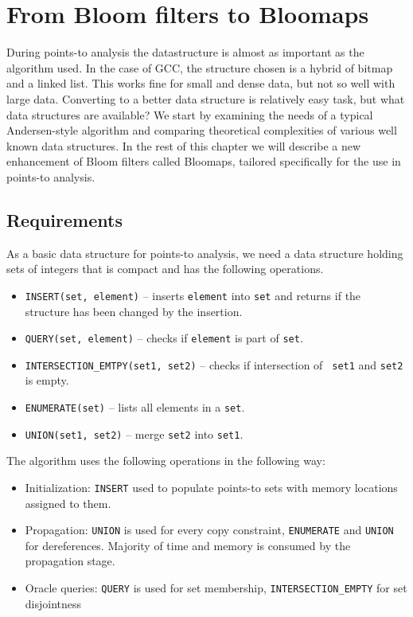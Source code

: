 \chapter{From Bloom filters to Bloomaps}
\label{chap-bloomaps}

During points-to analysis the datastructure is almost as important as the
algorithm used. In the case of GCC, the structure chosen is a hybrid of bitmap
and a linked list. This works fine for small and dense data, but not so well
with large data. Converting to a better data structure is relatively easy task, but what data
structures are available? We start by examining the needs of a typical
Andersen-style algorithm and comparing theoretical complexities of various well
known data structures. In the rest of this chapter we will describe a new
enhancement of Bloom filters called Bloomaps, tailored specifically for the use
in points-to analysis.

\section{Requirements}

As a basic data structure for points-to analysis, we need a data structure holding sets of
integers that is compact and has the following operations.

\begin{itemize}
	\item {\tt INSERT(set, element)} -- inserts {\tt element} into {\tt set} and returns if
		the structure has been changed by the insertion.
	\item {\tt QUERY(set, element)} -- checks if {\tt element} is part of {\tt set}.
	\item {\tt INTERSECTION\_EMTPY(set1, set2)} -- checks if intersection of {\tt
		set1} and {\tt set2} is empty.
	\item {\tt ENUMERATE(set)} -- lists all elements in a {\tt set}.
	\item {\tt UNION(set1, set2)} -- merge {\tt set2} into {\tt set1}.
\end{itemize}

The algorithm uses the following operations in the following way:

\begin{itemize}
	\item Initialization: {\tt INSERT} used to populate points-to sets with
		memory locations assigned to them.
	\item Propagation: {\tt UNION} is used for every copy constraint, {\tt ENUMERATE} and
		{\tt UNION} for dereferences. Majority of time and memory is consumed by
		the propagation stage.
	\item Oracle queries: {\tt QUERY} is used for set membership, {\tt INTERSECTION\_EMPTY}
		for set disjointness
\end{itemize}

